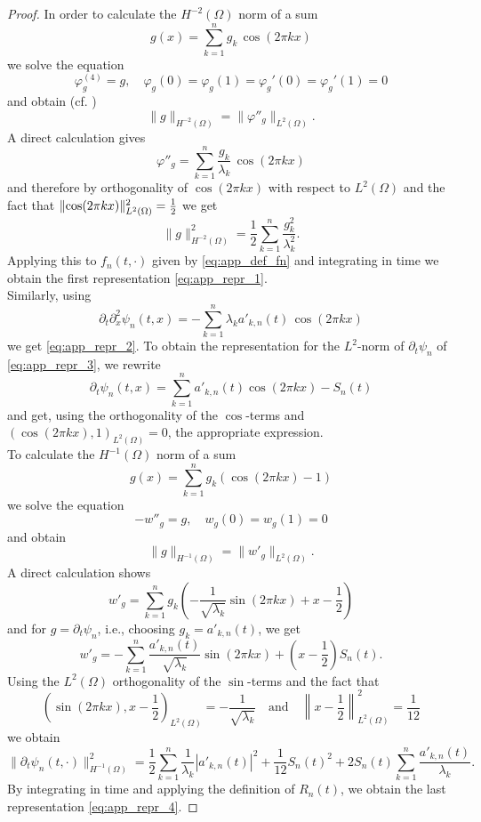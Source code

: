 \documentclass{m2an}
\newcommand{\1}{\mathds{1}}
\DeclarePairedDelimiter{\norm}{\lVert}{\rVert}
\newcommand{\half}{\frac{1}{2}}
\theoremstyle{definition}
\newcommand{\Cref}[1]{\zcref{#1}}
\begin{document}
\begin{proof}
In order to calculate the $H^{-2}(\Omega)$ norm of a sum
\[
g(x) = \sum_{k=1}^n g_k\,\cos(2\pi k x)
\]
we solve the equation
\[
\varphi_g^{(4)} = g, \quad \varphi_g(0) = \varphi_g(1) = \varphi_g'(0) = \varphi_g'(1) = 0
\]
and obtain (cf. \Cref{lemm:h2_norm_equivalence})
\[
\|g\|_{H^{-2}(\Omega)} = \|\varphi''_g\|_{L^2(\Omega)}.
\]
A direct calculation gives
\[
\varphi''_g = \sum_{k=1}^n \frac{g_k}{\lambda_k}\,\cos(2\pi k x)
\]
and therefore by orthogonality of $\cos(2\pi k x)$ with respect to $L^2(\Omega)$ and the fact that $\norm{\cos(2\pi k x)}^2_{L^2(\Omega)} = \frac{1}{2}$ we get
\[
\|g\|_{H^{-2}(\Omega)}^2 = \half \sum_{k=1}^n \frac{g_k^2}{\lambda_k^2}.
\]
Applying this to $f_n(t,\cdot)$ given by \eqref{eq:app_def_fn} and integrating in time we obtain the first representation \eqref{eq:app_repr_1}.\\

Similarly, using
\[
 \partial_t\partial_x^2\psi_n(t,x) = -\sum_{k=1}^n \lambda_k a'_{k,n}(t)\,\cos(2\pi k x)
\]
we get \eqref{eq:app_repr_2}.
% 
To obtain the representation for the $L^2$-norm of $\partial_t \psi_n$ of \eqref{eq:app_repr_3}, we rewrite
\[
\partial_t\psi_n(t,x) = \sum_{k=1}^n a'_{k,n}(t)\cos(2\pi k x) - S_n(t)
\]
and get, using the orthogonality of the $\cos$-terms and $(\cos(2\pi k x),1)_{L^2(\Omega)}=0$,
the appropriate expression.\\

To calculate the $H^{-1}(\Omega)$ norm of a sum
\[
g(x) = \sum_{k=1}^n g_k\left(\cos(2\pi k x)-1\right)
\]
we solve the equation
\[
-w''_g = g, \quad w_g(0) = w_g(1) = 0
\]
and obtain
\[
\|g\|_{H^{-1}(\Omega)} = \|w'_g\|_{L^2(\Omega)}.
\]
A direct calculation shows
\[
w'_g = \sum_{k=1}^n g_k \left(-\frac{1}{\sqrt{\lambda_k}}\sin(2\pi k x) + x -\frac{1}{2} \right)
\]
and for $g = \partial_t \psi_n$, i.e., choosing $g_k = a'_{k,n}(t)$, we get
\[
w'_g = -\sum_{k=1}^n \frac{a'_{k,n}(t)}{\sqrt{\lambda_k}}\sin(2\pi k x) + \left(x -\frac{1}{2} \right)S_n(t).
\]
Using the $L^2(\Omega)$ orthogonality of the $\sin$-terms and the fact that
\[
\left(\sin(2\pi k x),x-\frac{1}{2}\right)_{L^2(\Omega)} = -\frac{1}{\sqrt{\lambda_k}} \quad\text{and}\quad \left\|x-\frac{1}{2}\right\|_{L^2(\Omega)}^2 = \frac{1}{12}
\]
we obtain
\[
\|\partial_t \psi_n(t,\cdot)\|^2_{H^{-1}(\Omega)} = \frac{1}{2}\sum_{k=1}^n \frac{1}{\lambda_k} |a'_{k,n}(t)|^2 + \frac{1}{12} S_n(t)^2 + 2 S_n(t) \sum_{k=1}^n \frac{a'_{k,n}(t)}{\lambda_k}.
\]
By integrating in time and applying the definition of $R_n(t)$, we obtain the last representation 
\eqref{eq:app_repr_4}.
\end{proof}
\end{document}
